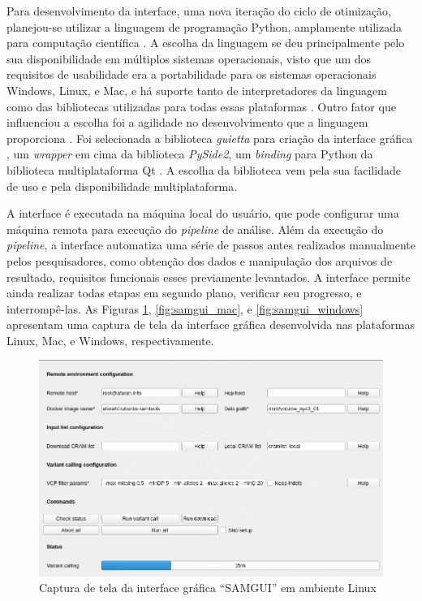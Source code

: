 \documentclass[cic,tc]{iiufrgs}
\begin{document}
Para desenvolvimento da interface, uma nova iteração do ciclo de otimização,
planejou-se utilizar a linguagem de programação Python, amplamente utilizada
para computação científica \cite{oliphant2007python}. A escolha da linguagem se
deu principalmente pelo sua disponibilidade em múltiplos sistemas operacionais,
visto que um dos requisitos de usabilidade era a portabilidade para os sistemas
operacionais Windows, Linux, e Mac, e há suporte tanto de interpretadores da
linguagem como das bibliotecas utilizadas para todas essas plataformas
\cite{oliphant2007python}. Outro fator que influenciou a escolha foi a
agilidade no desenvolvimento que a linguagem proporciona
\cite{oliphant2007python}. Foi selecionada a biblioteca \textit{guietta} para
criação da interface gráfica \cite{guietta}, um \textit{wrapper} em cima da
biblioteca \textit{PySide2}, um \textit{binding} para Python da biblioteca
multiplataforma Qt \cite{loganathan2013pyside}. A escolha da biblioteca vem
pela sua facilidade de uso e pela disponibilidade multiplataforma. 

A interface é executada na máquina local do usuário, que pode configurar uma
máquina remota para execução do \textit{pipeline} de análise. Além da execução
do \textit{pipeline}, a interface automatiza uma série de passos
antes realizados manualmente pelos pesquisadores, como obtenção dos dados e manipulação dos
arquivos de resultado, requisitos funcionais esses previamente levantados. A
interface permite ainda realizar todas etapas em segundo plano, verificar seu
progresso, e interrompê-las. As Figuras \ref{fig:samgui_linux},
\ref{fig:samgui_mac}, e \ref{fig:samgui_windows} apresentam uma captura de tela
da interface gráfica desenvolvida nas plataformas Linux, Mac, e Windows,
respectivamente.

\begin{figure}
  \caption{Captura de tela da interface gráfica ``SAMGUI'' em ambiente Linux}
    \begin{center}
      \includegraphics[width=0.85\linewidth]{img/samgui_linux.png}
    \end{center}
    \label{fig:samgui_linux}
\end{figure}
\end{document}
